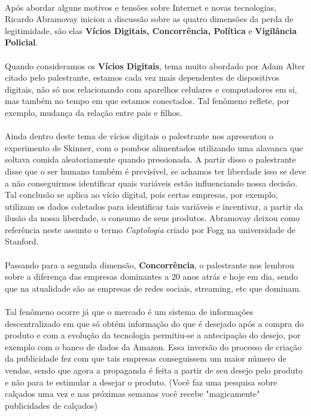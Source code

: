 \documentclass[12pt]{article}
\begin{document}
	\paragraph{}
		Após abordar alguns motivos e tensões sobre Internet e novas tecnologias,
		Ricardo Abramovay iniciou a discussão sobre as quatro dimensões da perda
		de legitimidade, são elas \textbf{Vícios Digitais, Concorrência, Política} e 
		\textbf{Vigilância Policial}.
	\paragraph{}	
		Quando consideramos os \textbf{Vícios Digitais}, tema muito abordado
		por Adam Alter citado pelo palestrante, estamos cada vez mais 
		dependentes de dispositivos digitais, não só nos relacionando com aparelhos 
		celulares e computadores em si, mas também no tempo em que estamos 
		conectados. Tal fenômeno reflete, por exemplo, mudança da relação 
		entre pais e filhos.
    \paragraph{}
    	Ainda dentro deste tema de vícios digitais o palestrante nos apresentou
    	o experimento de Skinner, com o pombos alimentados utilizando uma 
    	alavanca que soltava comida aleatoriamente quando pressionada. A partir
    	disso o palestrante disse que o ser humano também é previsível, se achamos
    	ter liberdade isso se deve a não conseguirmos identificar quais variáveis 
    	estão influenciando nossa decisão. Tal conclusão se aplica ao vício digital,
    	pois certas empresas, por exemplo, utilizam os dados coletados para
    	identificar tais variáveis e incentivar, a partir da ilusão da nossa liberdade,
    	o consumo de seus produtos.
    	Abramovay deixou como referência neste assunto o termo \textit{Captologia}
    	criado por Fogg na  universidade de Stanford.
	\paragraph{}
		Passando para a segunda dimensão, \textbf{Concorrência}, o palestrante
	   	nos lembrou sobre a diferença das empresas dominantes a 20 anos atrás e 
	   	hoje em dia, sendo que na atualidade são as empresas de redes sociais,
	   	streaming, etc que dominam. 
	\paragraph{}	   	
	   	Tal fenômeno ocorre já que o mercado é um sistema de informações 
	   	descentralizado em que só obtém informação do que é desejado após a 
	   	compra do produto e com a evolução da tecnologia permitiu-se a 
	   	antecipação do desejo, por exemplo com o banco de dados da Amazon.
	   	Essa inversão do processo de criação da publicidade fez com que tais
	   	empresas conseguissem um maior número de vendas, sendo que agora
	   	a propaganda é feita a partir de seu desejo pelo produto e não para te 
	   	estimular a desejar o produto. (Você faz uma pesquisa sobre calçados
	   	uma vez e nas próximas semanas você recebe "magicamente" publicidades
	   	de calçados)
\end{document}

